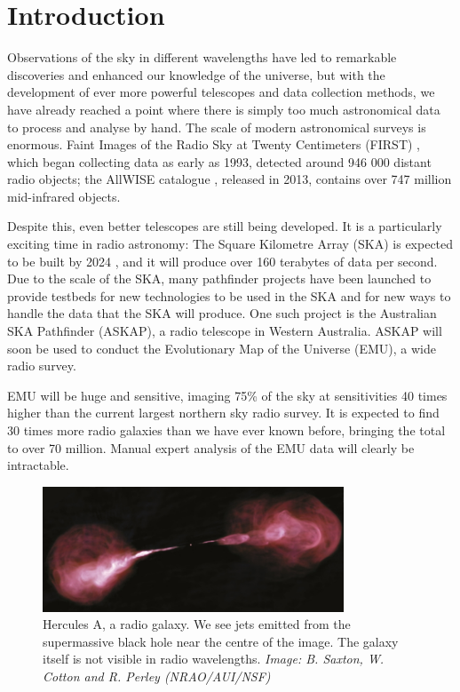 
\chapter{Introduction}
\label{cha:intro}

Observations of the sky in different wavelengths have led to remarkable
discoveries and enhanced our knowledge of the universe, but with the development
of ever more powerful telescopes and data collection methods, we have already
reached a point where there is simply too much astronomical data to process and
analyse by hand. The scale of modern astronomical surveys is enormous. Faint
Images of the Radio Sky at Twenty Centimeters (FIRST) \citep{becker95}, which
began collecting data as early as 1993, detected around 946 000 distant radio
objects; the AllWISE catalogue \citep{cutri13}, released in 2013, contains over
747 million mid-infrared objects.

Despite this, even better telescopes are still being developed. It is a
particularly exciting time in radio astronomy: The Square Kilometre Array (SKA)
is expected to be built by 2024 \citep{ska}, and it will produce over 160
terabytes of data per second. Due to the scale of the SKA, many pathfinder
projects have been launched to provide testbeds for new technologies to be used
in the SKA and for new ways to handle the data that the SKA will produce. One
such project is the Australian SKA Pathfinder (ASKAP), a radio telescope in
Western Australia. ASKAP will soon be used to conduct the Evolutionary Map of
the Universe (EMU), a wide radio survey.

EMU will be huge and sensitive, imaging 75\% of the sky at sensitivities 40
times higher than the current largest northern sky radio survey. It is expected
to find 30 times more radio galaxies than we have ever known before, bringing
the total to over 70 million. Manual expert analysis of the EMU data will
clearly be intractable.

\begin{figure}
  \centering
  \includegraphics[width=0.8\textwidth]{images/herculesA.jpg}
  \caption{Hercules A, a radio galaxy. We see jets emitted from the supermassive
    black hole near the centre of the image. The galaxy itself is not visible in
    radio wavelengths. \emph{Image: B. Saxton, W. Cotton and R. Perley
    (NRAO/AUI/NSF)}}
  \label{fig:radio-galaxy}
\end{figure}

